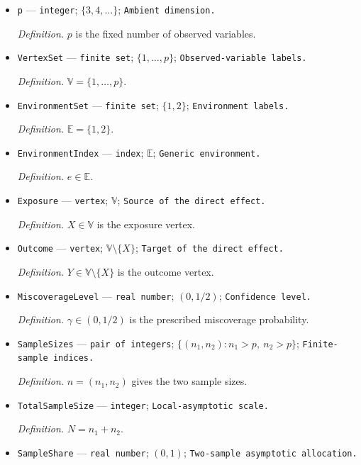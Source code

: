 \documentclass{article}
\begin{document}
\begin{itemize}
  \item \texttt{p} --- \texttt{integer}; \(\{3,4,\ldots\}\); \texttt{Ambient dimension.}
  \par\smallskip\noindent\emph{Definition.} \(p\) is the fixed number of observed variables.
  \item \texttt{VertexSet} --- \texttt{finite set}; \(\{1,\ldots,p\}\); \texttt{Observed-\allowbreak{}variable labels.}
  \par\smallskip\noindent\emph{Definition.} \(\mathbb V=\{1,\ldots,p\}\).
  \item \texttt{EnvironmentSet} --- \texttt{finite set}; \(\{1,2\}\); \texttt{Environment labels.}
  \par\smallskip\noindent\emph{Definition.} \(\mathbb E=\{1,2\}\).
  \item \texttt{EnvironmentIndex} --- \texttt{index}; \(\mathbb E\); \texttt{Generic environment.}
  \par\smallskip\noindent\emph{Definition.} \(e\in\mathbb E\).
  \item \texttt{Exposure} --- \texttt{vertex}; \(\mathbb V\); \texttt{Source of the direct effect.}
  \par\smallskip\noindent\emph{Definition.} \(X\in\mathbb V\) is the exposure vertex.
  \item \texttt{Outcome} --- \texttt{vertex}; \(\mathbb V\setminus\{X\}\); \texttt{Target of the direct effect.}
  \par\smallskip\noindent\emph{Definition.} \(Y\in\mathbb V\setminus\{X\}\) is the outcome vertex.
  \item \texttt{MiscoverageLevel} --- \texttt{real number}; \((0,1/2)\); \texttt{Confidence level.}
  \par\smallskip\noindent\emph{Definition.} \(\gamma\in(0,1/2)\) is the prescribed miscoverage probability.
  \item \texttt{SampleSizes} --- \texttt{pair of integers}; \(\{(n_1,n_2):n_1>p,\ n_2>p\}\); \texttt{Finite-\allowbreak{}sample indices.}
  \par\smallskip\noindent\emph{Definition.} \(n=(n_1,n_2)\) gives the two sample sizes.
  \item \texttt{TotalSampleSize} --- \texttt{integer}; \texttt{Local-\allowbreak{}asymptotic scale.}
  \par\smallskip\noindent\emph{Definition.} \(N=n_1+n_2\).
  \item \texttt{SampleShare} --- \texttt{real number}; \((0,1)\); \texttt{Two-\allowbreak{}sample asymptotic allocation.}

\end{itemize}
\end{document}
